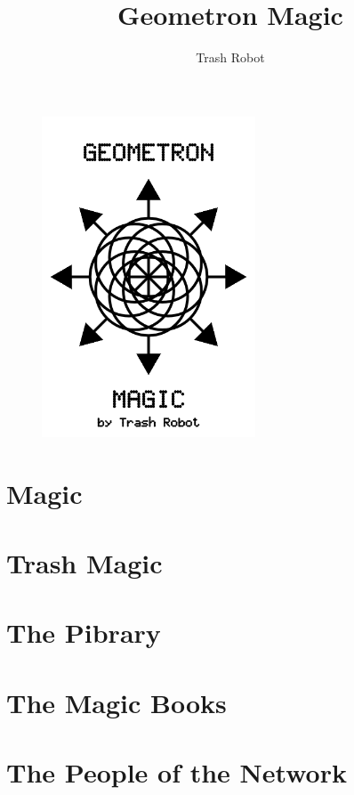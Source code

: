 \documentclass[ebook,12pt,openany]{memoir} %
\title{Geometron Magic}
\author{Trash Robot}
\begin{document}
\frontmatter
\begin{figure}[htbp]
\centering
\includegraphics[width=2.5in]{cover.png}
\end{figure}

\clearpage

\clearpage

\newpage
\thispagestyle{empty}
\mbox{}

\maketitle

\tableofcontents


%

\mainmatter

\chapter{Magic}

\chapter{Trash Magic}

\chapter{The Pibrary}

\chapter{The Magic Books}

\chapter{The People of the Network}

\end{document}
